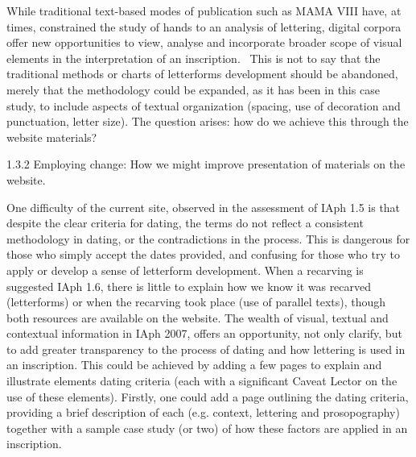 \documentclass[amsthm,ebook]{saparticle}
\begin{document}
\bigskip

While traditional text-based modes of publication such as MAMA VIII have, at times, constrained the study of hands to an
analysis of lettering, digital corpora offer new opportunities to view, analyse and incorporate broader scope of visual
elements in the interpretation of an inscription. \ This is not to say that the traditional methods or charts of
letterforms development should be abandoned, merely that the methodology could be expanded, as it has been in this case
study, to include aspects of textual organization (spacing, use of decoration and punctuation, letter size). The
question arises: how do we achieve this through the website materials? 


\bigskip


\bigskip

1.3.2 Employing change: How we might improve presentation of materials on the website.


\bigskip

One difficulty of the current site, observed in the assessment of IAph 1.5 is that despite the clear criteria for
dating, the terms do not reflect a consistent methodology in dating, or the contradictions in the process. This is
dangerous for those who simply accept the dates provided, and confusing for those who try to apply or develop a sense
of letterform development. When a recarving is suggested IAph 1.6, there is little to explain how we know it was
recarved (letterforms) or when the recarving took place (use of parallel texts), though both resources are available on
the website. The wealth of visual, textual and contextual information in IAph 2007, offers an opportunity, not only
clarify, but to add greater transparency to the process of dating and how lettering is used in an inscription. This
could be achieved by adding a few pages to explain and illustrate elements dating criteria (each with a significant
Caveat Lector on the use of these elements). Firstly, one could add a page outlining the dating criteria, providing a
brief description of each (e.g. context, lettering and prosopography) together with a sample case study (or two) of how
these factors are applied in an inscription. 


\bigskip
\end{document}
